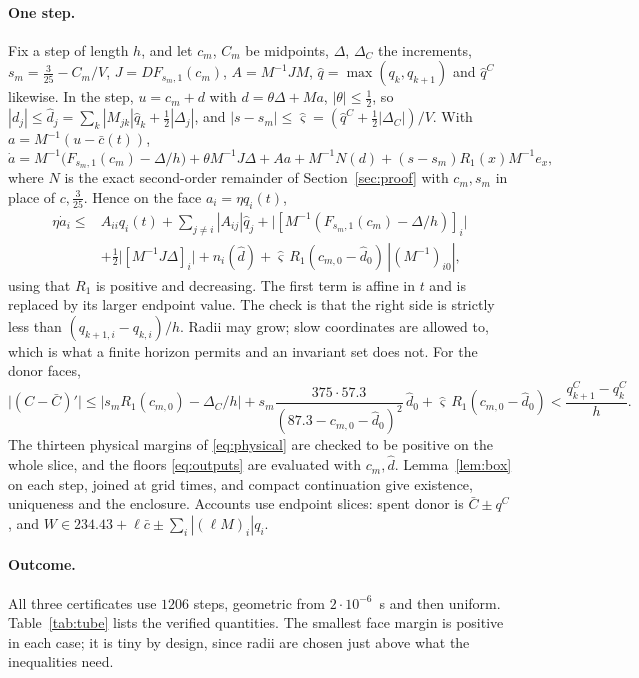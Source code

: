 \documentclass[11pt,a4paper]{article}
\theoremstyle{plain}
\theoremstyle{definition}
\theoremstyle{remark}
\begin{document}
\paragraph{One step.}
Fix a step of length $h$, and let $c_m$, $C_m$ be midpoints, $\Delta$,
$\Delta_C$ the increments, $s_m=\tfrac3{25}-C_m/V$, $J=DF_{s_m,1}(c_m)$,
$A=M^{-1}JM$, $\hat q=\max(q_k,q_{k+1})$ and $\hat q^C$ likewise. In the step,
$u=c_m+d$ with $d=\theta\Delta+Ma$, $|\theta|\le\frac12$, so
$|d_j|\le\hat d_j=\sum_k|M_{jk}|\hat q_k+\frac12|\Delta_j|$, and
$|s-s_m|\le\hat\varsigma=(\hat q^C+\frac12|\Delta_C|)/V$. With
$a=M^{-1}(u-\bar c(t))$,
\[
\dot a=M^{-1}\bigl(F_{s_m,1}(c_m)-\Delta/h\bigr)+\theta M^{-1}J\Delta+Aa
+M^{-1}N(d)+(s-s_m)R_1(x)M^{-1}e_x,
\]
where $N$ is the exact second-order remainder of
Section~\ref{sec:proof} with $c_m,s_m$ in place of $c,\tfrac3{25}$. Hence on
the face $a_i=\eta q_i(t)$,
\begin{equation}\label{eq:stepface}
\begin{aligned}
\eta\dot a_i\le{}& A_{ii}q_i(t)+\sum_{j\ne i}|A_{ij}|\hat q_j
+\bigl|[M^{-1}(F_{s_m,1}(c_m)-\Delta/h)]_i\bigr|\\
&+\tfrac12\bigl|[M^{-1}J\Delta]_i\bigr|
+n_i(\hat d)+\hat\varsigma\,R_1(c_{m,0}-\hat d_0)\,|(M^{-1})_{i0}| ,
\end{aligned}
\end{equation}
using that $R_1$ is positive and decreasing. The first term is affine in $t$
and is replaced by its larger endpoint value. The check is that the right side
is strictly less than $(q_{k+1,i}-q_{k,i})/h$. Radii may grow; slow
coordinates are allowed to, which is what a finite horizon permits and an
invariant set does not. For the donor faces,
\[
\bigl|(C-\bar C)'\bigr|\le\bigl|s_mR_1(c_{m,0})-\Delta_C/h\bigr|
+s_m\frac{375\cdot57.3}{(87.3-c_{m,0}-\hat d_0)^2}\,\hat d_0
+\hat\varsigma\,R_1(c_{m,0}-\hat d_0)<\frac{q^C_{k+1}-q^C_k}{h}.
\]
The thirteen physical margins of \eqref{eq:physical} are checked to be positive
on the whole slice, and the floors \eqref{eq:outputs} are evaluated with
$c_m,\hat d$. Lemma~\ref{lem:box} on each step, joined at grid times, and
compact continuation give existence, uniqueness and the enclosure. Accounts
use endpoint slices: spent donor is $\bar C\pm q^C$, and
$W\in234.43+\ell\bar c\pm\sum_i|(\ell M)_i|q_i$.

\paragraph{Outcome.}
All three certificates use $1206$ steps, geometric from $2\cdot10^{-6}$~s and
then uniform. Table~\ref{tab:tube} lists the verified quantities. The smallest
face margin is positive in each case; it is tiny by design, since radii are
chosen just above what the inequalities need.
\end{document}
